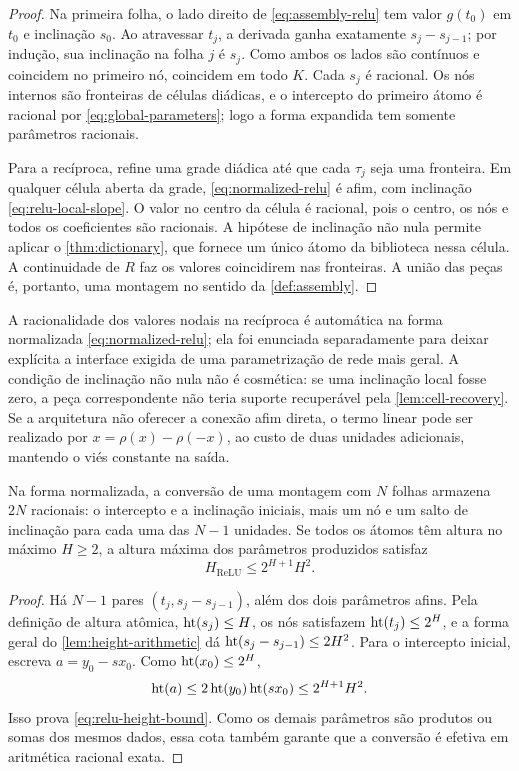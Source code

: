 \begin{proof}
Na primeira folha, o lado direito de \eqref{eq:assembly-relu} tem valor
$g(t_0)$ em $t_0$ e inclinação $s_0$. Ao atravessar $t_j$, a derivada ganha
exatamente $s_j-s_{j-1}$; por indução, sua inclinação na folha $j$ é $s_j$.
Como ambos os lados são contínuos e coincidem no primeiro nó, coincidem em
todo $K$. Cada $s_j$ é racional. Os nós internos são fronteiras de células
diádicas, e o intercepto do primeiro átomo é racional por
\eqref{eq:global-parameters}; logo a forma expandida tem somente parâmetros
racionais.

Para a recíproca, refine uma grade diádica até que cada $\tau_j$ seja uma
fronteira. Em qualquer célula aberta da grade, \eqref{eq:normalized-relu} é
afim, com inclinação \eqref{eq:relu-local-slope}. O valor no centro da célula
é racional, pois o centro, os nós e todos os coeficientes são racionais. A
hipótese de inclinação não nula permite aplicar o
\cref{thm:dictionary}, que fornece um único átomo da biblioteca nessa célula.
A continuidade de $R$ faz os valores coincidirem nas fronteiras. A união das
peças é, portanto, uma montagem no sentido da \cref{def:assembly}.
\end{proof}

A racionalidade dos valores nodais na recíproca é automática na forma
normalizada \eqref{eq:normalized-relu}; ela foi enunciada separadamente para
deixar explícita a interface exigida de uma parametrização de rede mais geral.
A condição de inclinação não nula não é cosmética: se uma inclinação local
fosse zero, a peça correspondente não teria suporte recuperável pela
\cref{lem:cell-recovery}. Se a arquitetura não oferecer a conexão afim direta,
o termo linear pode ser realizado por
$x=\rho(x)-\rho(-x)$, ao custo de duas unidades adicionais, mantendo o viés
constante na saída.

\begin{proposition}
\label{prop:relu-complexity}
Na forma normalizada, a conversão de uma montagem com $N$ folhas armazena
$2N$ racionais: o intercepto e a inclinação iniciais, mais um nó e um salto de
inclinação para cada uma das $N-1$ unidades. Se todos os átomos têm altura no
máximo $H\ge2$, a altura máxima dos parâmetros produzidos satisfaz
\begin{equation}
 H_{\mathrm{ReLU}}\le 2^{H+1}H^2.
 \label{eq:relu-height-bound}
\end{equation}
\end{proposition}

\begin{proof}
Há $N-1$ pares $(t_j,s_j-s_{j-1})$, além dos dois parâmetros afins. Pela
definição de altura atômica, $\operatorname{ht}(s_j)\le H$, os nós satisfazem
$\operatorname{ht}(t_j)\le2^H$, e a forma geral do
\cref{lem:height-arithmetic} dá
$\operatorname{ht}(s_j-s_{j-1})\le2H^2$. Para o intercepto inicial, escreva
$a=y_0-sx_0$. Como $\operatorname{ht}(x_0)\le2^H$,
\[
 \operatorname{ht}(a)\le2\operatorname{ht}(y_0)\operatorname{ht}(sx_0)
 \le2^{H+1}H^2.
\]
Isso prova \eqref{eq:relu-height-bound}. Como
os demais parâmetros são produtos ou somas dos mesmos dados, essa cota também
garante que a conversão é efetiva em aritmética racional exata.
\end{proof}

